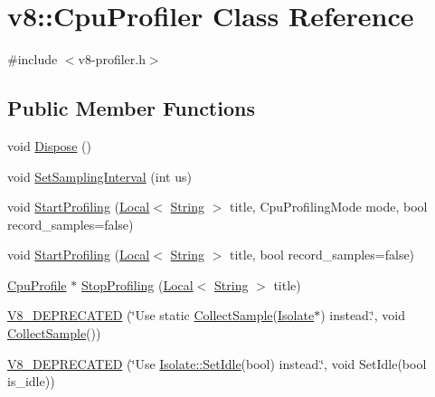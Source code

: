 \hypertarget{classv8_1_1CpuProfiler}{}\section{v8\+:\+:Cpu\+Profiler Class Reference}
\label{classv8_1_1CpuProfiler}


{\ttfamily \#include $<$v8-\/profiler.\+h$>$}

\subsection*{Public Member Functions}
\begin{DoxyCompactItemize}
\item 
void \mbox{\hyperlink{classv8_1_1CpuProfiler_ab49b3f25a897dc6a359571b3014cd225}{Dispose}} ()
\item 
void \mbox{\hyperlink{classv8_1_1CpuProfiler_ac5b05c72fb899e20adfa7f8cc57f21fb}{Set\+Sampling\+Interval}} (int us)
\item 
void \mbox{\hyperlink{classv8_1_1CpuProfiler_a65ff4a18ab14143e094e2ea189facabd}{Start\+Profiling}} (\mbox{\hyperlink{classv8_1_1Local}{Local}}$<$ \mbox{\hyperlink{classv8_1_1String}{String}} $>$ title, Cpu\+Profiling\+Mode mode, bool record\+\_\+samples=false)
\item 
void \mbox{\hyperlink{classv8_1_1CpuProfiler_a7a9b75d3d7285d90344e1b8f14e97076}{Start\+Profiling}} (\mbox{\hyperlink{classv8_1_1Local}{Local}}$<$ \mbox{\hyperlink{classv8_1_1String}{String}} $>$ title, bool record\+\_\+samples=false)
\item 
\mbox{\hyperlink{classv8_1_1CpuProfile}{Cpu\+Profile}} $\ast$ \mbox{\hyperlink{classv8_1_1CpuProfiler_a34acaa3b0e40cf2f92e9e6acb3fb5de7}{Stop\+Profiling}} (\mbox{\hyperlink{classv8_1_1Local}{Local}}$<$ \mbox{\hyperlink{classv8_1_1String}{String}} $>$ title)
\item 
\mbox{\hyperlink{classv8_1_1CpuProfiler_a8ddea26e13e631875cb41dcb2563ff40}{V8\+\_\+\+D\+E\+P\+R\+E\+C\+A\+T\+ED}} (\char`\"{}Use static \mbox{\hyperlink{classv8_1_1CpuProfiler_a88b787078f0c8742b3c077af0de4f46b}{Collect\+Sample}}(\mbox{\hyperlink{classv8_1_1Isolate}{Isolate}}$\ast$) instead.\char`\"{}, void \mbox{\hyperlink{classv8_1_1CpuProfiler_a88b787078f0c8742b3c077af0de4f46b}{Collect\+Sample}}())
\item 
\mbox{\hyperlink{classv8_1_1CpuProfiler_aa5a41d80d7d262f2c171a4382f2fbd4f}{V8\+\_\+\+D\+E\+P\+R\+E\+C\+A\+T\+ED}} (\char`\"{}Use \mbox{\hyperlink{classv8_1_1Isolate_a9b5a3d4caed212eabb58a2b0a54e7a5d}{Isolate\+::\+Set\+Idle}}(bool) instead.\char`\"{}, void Set\+Idle(bool is\+\_\+idle))
\end{DoxyCompactItemize}
